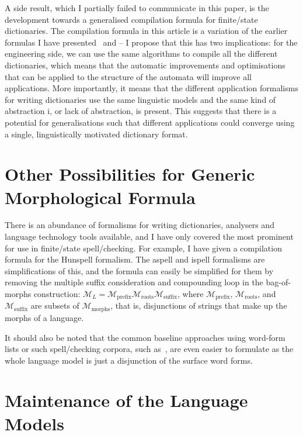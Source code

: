 \documentclass[officiallayout,final]{unihelcompling}
\begin{document}
A side result, which I partially failed to communicate in this paper, is the
development towards a generalised compilation formula for finite\-/state
dictionaries. The compilation formula in this article is a variation of the
earlier formulas I have presented~\citep{linden2009hfst} and
 -- I propose that this has two implications:
for the engineering side, we can use the same algorithms to compile all the
different dictionaries, which means that the automatic improvements and
optimisations that can be applied to the structure of the automata will improve
all applications. More importantly, it means that the different application
formalisms for writing dictionaries use the same linguistic models and the same
kind of abstraction i, or lack of abstraction, is present. This suggests that
there is a potential for generalisations such that different applications could
converge using a single, linguistically motivated dictionary format.

\section{Other Possibilities for Generic Morphological Formula}
\label{sec:other-lms}

There is an abundance of formalisms for writing dictionaries, analysers and
language technology tools available, and I have only covered the most prominent
for use in finite\-/state spell\-/checking. For example, I have given a
compilation formula for the Hunspell formalism. The aspell and ispell
formalisms are simplifications of this, and the formula can easily be
simplified for them by removing the multiple suffix consideration and
compounding loop in the bag-of-morphs construction: $\mathcal{M}_L =
\mathcal{M}_\mathrm{prefix} \mathcal{M}_\mathrm{roots}
\mathcal{M}_\mathrm{suffix}$, where $\mathcal{M}_\mathrm{prefix}$,
$\mathcal{M}_\mathrm{roots}$, and $\mathcal{M}_\mathrm{suffix}$ are subsets of
$\mathcal{M}_\mathrm{morphs}$, that is, disjunctions of strings that make up
the morphs of a language.

It should also be noted that the common baseline approaches using word-form
lists or such spell\-/checking corpora, such as~\citet{norvig2010howto}, are
even easier to formulate as the whole language model is just a disjunction of
the surface word forms.

\section{Maintenance of the Language Models}
\label{sec:maintenance}
\end{document}
